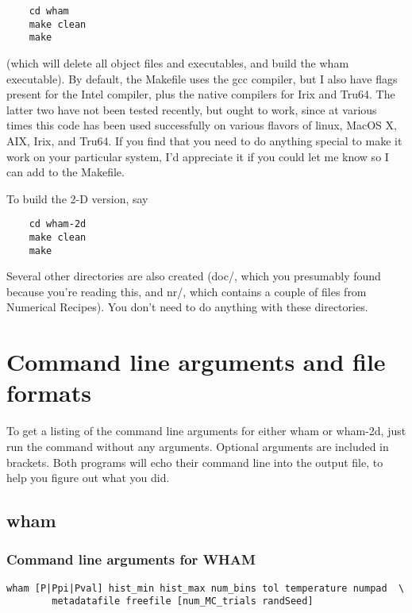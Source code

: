 \documentclass[12pt]{article}
\begin{document}
\begin{verbatim}
    cd wham
    make clean
    make
\end{verbatim}

(which will delete all object files and executables, and build the wham
executable).  By default, the Makefile uses the gcc compiler, but I also have
flags present for the Intel compiler, plus the native compilers for Irix and
Tru64.  The latter two have not been tested recently, but ought to work,
since at various times this code has been used successfully on various
flavors of linux, MacOS X, AIX, Irix, and Tru64.  If you find that you need
to do anything special to make it work on your particular system, I'd
appreciate it if you could let me know so I can add to the Makefile.

To build the 2-D version,  say

\begin{verbatim}
    cd wham-2d
    make clean
    make
\end{verbatim}

Several other directories are also created (doc/, which you presumably found
because you're reading this, and nr/, which contains a couple of files from
Numerical Recipes).  You don't need to do anything with these directories.

\section{Command line arguments and file formats}

To get a listing of the command line arguments for either wham or wham-2d,
just run the command without any arguments.  Optional arguments are
included in brackets.  Both programs will echo their command line into the
output file, to help you figure out what you did.

\subsection{wham}

\subsubsection{Command line arguments for WHAM}

\begin{verbatim}
wham [P|Ppi|Pval] hist_min hist_max num_bins tol temperature numpad  \
        metadatafile freefile [num_MC_trials randSeed]
\end{verbatim}
\end{document}
